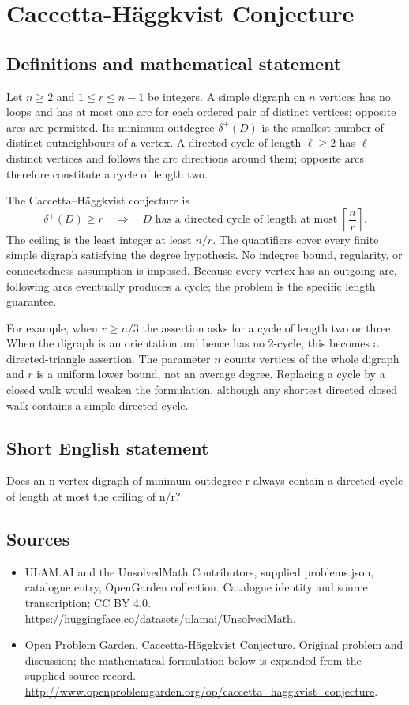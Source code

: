 \documentclass[11pt,a4paper]{article}
\begin{document}
\section*{Caccetta-Häggkvist Conjecture}\label{statement}

\subsection{Definitions and mathematical statement}
Let $n\ge2$ and $1\le r\le n-1$ be integers. A simple digraph on $n$
vertices has no loops and has at most one arc for each ordered pair of
distinct vertices; opposite arcs are permitted. Its minimum outdegree
$\delta^+(D)$ is the smallest number of distinct outneighbours of a
vertex. A directed cycle of length $\ell\ge2$ has $\ell$ distinct
vertices and follows the arc directions around them; opposite arcs
therefore constitute a cycle of length two.

The Caccetta--Häggkvist conjecture is
\[
 \delta^+(D)\ge r\quad\Longrightarrow\quad
 D\text{ has a directed cycle of length at most }
                         \left\lceil\frac nr\right\rceil.
\]
The ceiling is the least integer at least $n/r$. The quantifiers cover
every finite simple digraph satisfying the degree hypothesis. No
indegree bound, regularity, or connectedness assumption is imposed.
Because every vertex has an outgoing arc, following arcs eventually
produces a cycle; the problem is the specific length guarantee.

For example, when $r\ge n/3$ the assertion asks for a cycle of length
two or three. When the digraph is an orientation and hence has no
2-cycle, this becomes a directed-triangle assertion. The parameter $n$
counts vertices of the whole digraph and $r$ is a uniform lower bound,
not an average degree. Replacing a cycle by a closed walk would weaken
the formulation, although any shortest directed closed walk contains
a simple directed cycle.
\subsection{Short English statement}
Does an n-vertex digraph of minimum outdegree r always contain a directed cycle of length at most the ceiling of n/r?
\subsection{Sources}
\begin{itemize}
\item[S1] ULAM.AI and the UnsolvedMath Contributors, supplied problems.json, catalogue entry, OpenGarden collection. Catalogue identity and source transcription; CC BY 4.0.
\url{https://huggingface.co/datasets/ulamai/UnsolvedMath}.
\item[S2] Open Problem Garden, Caccetta-Häggkvist Conjecture. Original problem and discussion; the mathematical formulation below is expanded from the supplied source record.
\url{http://www.openproblemgarden.org/op/caccetta_haggkvist_conjecture}.
\end{itemize}
\end{document}
